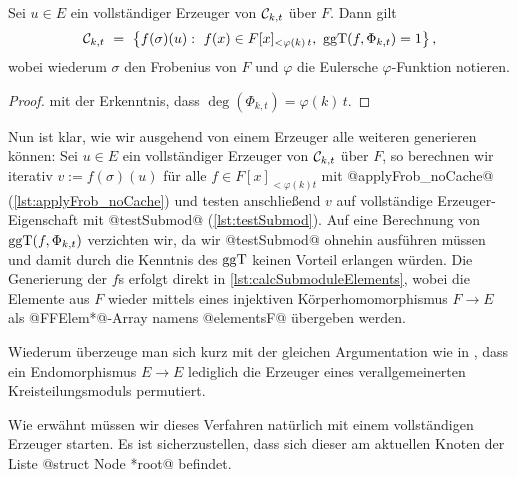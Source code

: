 \begin{lemma}
  \label{lemma:moduln_durch_polys}
  Sei $u\in E$ ein vollständiger Erzeuger von $\mathcal{C}_{k,t}$ über $F$. 
  Dann gilt
  \[ \C_{k,t} \speq= \big\{ f(\sigma)(u):\ f(x) \in F[x]_{<\varphi(k)\,t},\ 
    \ggT(f,\Phi_{k,t}) = 1 \big\} \,,\]
  wobei wiederum $\sigma$ den Frobenius von $F$ und 
  $\varphi$ die Eulersche $\varphi$-Funktion notieren.
\end{lemma}
\begin{proof}
   mit der Erkenntnis, dass
  $\deg(\Phi_{k,t}) = \varphi(k)\,t$.
\end{proof}

Nun ist klar, wie wir ausgehend von einem Erzeuger alle weiteren generieren
können: Sei $u \in E$ ein vollständiger Erzeuger von $\mathcal{C}_{k,t}$ über $F$, so 
berechnen wir iterativ $v := f(\sigma)(u)$ für alle $f \in F[x]_{<\varphi(k)t}$
mit @applyFrob_noCache@ (\autoref{lst:applyFrob_noCache}) 
und testen anschließend $v$ auf vollständige Erzeuger-Eigenschaft mit 
@testSubmod@ (\autoref{lst:testSubmod}). Auf eine Berechnung von 
$\operatorname{ggT}(f,\Phi_{k,t})$ verzichten wir, da wir @testSubmod@ ohnehin ausführen
müssen und damit durch die Kenntnis des $\operatorname{ggT}$ keinen Vorteil erlangen würden.
Die Generierung der $f$s erfolgt direkt in \autoref{lst:calcSubmoduleElements},
wobei die Elemente aus $F$ wieder mittels eines injektiven Körperhomomorphismus 
$F\to E$ als @FFElem*@-Array namens @elementsF@ übergeben werden.

\begin{bemerkung}
  Wiederum überzeuge man sich kurz mit der gleichen Argumentation wie in 
  \thref{lemma:einbettung_egal}, dass ein Endomorphismus $E\to E$ lediglich die
  Erzeuger eines verallgemeinerten Kreisteilungsmoduls permutiert.
\end{bemerkung}

Wie erwähnt müssen wir dieses Verfahren natürlich mit einem vollständigen
Erzeuger starten. Es ist sicherzustellen, dass sich dieser am aktuellen Knoten 
der Liste @struct Node *root@ befindet.

